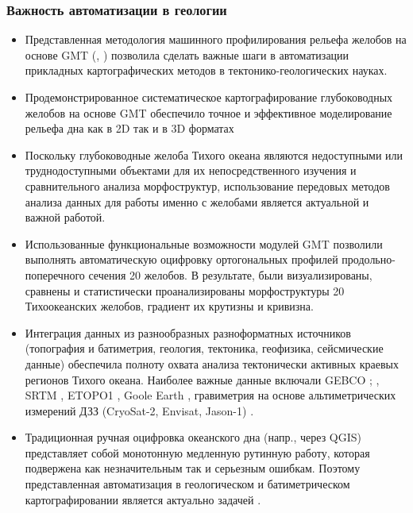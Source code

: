 \documentclass[pdflatex,compress,8pt,
	xcolor={dvipsnames,dvipsnames,svgnames,x11names,table},
	hyperref={colorlinks = true,breaklinks = true, urlcolor = NavyBlue}]{beamer}
\begin{document}
\begin{frame}\frametitle{Важность автоматизации в геологии}

\begin{itemize}\small
	\item Представленная методология машинного профилирования рельефа желобов на основе GMT (\cite{Wessel2019}, \cite{Wessel2018}) позволила сделать важные шаги в автоматизации прикладных картографических методов в тектонико-геологических науках. 	
	 \item Продемонстрированное систематическое картографирование глубоководных желобов на основе GMT ​​обеспечило точное и эффективное моделирование рельефа дна как в 2D так и в 3D форматах \cite{Lemenkova2007f}
	 \item Поскольку глубоководные желоба Тихого океана являются недоступными или труднодоступными объектами для их непосредственного изучения и сравнительного анализа морфоструктур, использование передовых методов анализа данных для работы именно с желобами является актуальной и важной работой.
	 \item Использованные функциональные возможности модулей GMT позволили выполнять автоматическую оцифровку ортогональных профилей продольно-поперечного сечения 20 желобов. В результате, были визуализированы, сравнены и статистически проанализированы морфоструктуры 20 Тихоокеанских желобов, градиент их крутизны и кривизна.
	 \item Интеграция данных из разнообразных разноформатных источников (топография и батиметрия, геология, тектоника, геофизика, сейсмические данные) обеспечила полноту охвата анализа тектонически активных краевых регионов Тихого океана. Наиболее важные данные включали GEBCO \cite{Mayeretal2018}; \cite{Monahan2004}, SRTM \cite{Beckeretal2009}, ETOPO1 \cite{AmanteEakins2009}, Goole Earth \cite{Lemenkova201510}, гравиметрия на основе альтиметрических измерений ДЗЗ (CryoSat-2, Envisat, Jason-1) \cite{Sandwelletal2013}.
	\item Традиционная ручная оцифровка океанского дна (напр., через QGIS)  представляет собой монотонную медленную рутинную работу, которая подвержена как незначительным так и серьезным ошибкам. Поэтому представленная автоматизация в геологическом и батиметрическом картографировании является актуально задачей \cite{Lemenkova2008b}. 

\end{itemize}

\end{frame}

\end{document}
